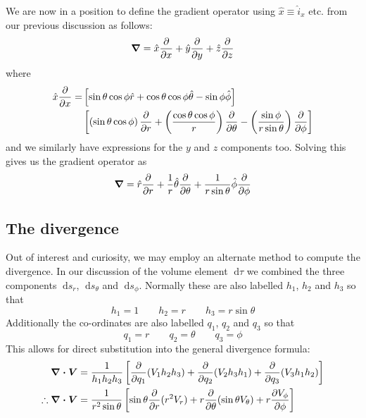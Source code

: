 \documentclass[english,seminar]{lecture}
\newcommand{\diff}{\;\textrm{d}}
\begin{document}
We are now in a position to define the gradient operator using $\hat{x} \equiv \hat{i}_x$ etc. from our previous discussion as follows:
\[
	\boldsymbol{\nabla} = \hat{x}{\partial\over\partial x} + \hat{y}{\partial\over\partial y} + \hat{z}{\partial\over\partial z}
\]
where
\begin{align*}
\hat{x}{\partial\over\partial x} = &\left[ \sin\theta\cos\phi\hat{r} + \cos\theta\cos\phi\hat{\theta} - \sin\phi\hat{\phi} \right] \\
&\left[ \left(\sin\theta\cos\phi\right){\partial\over\partial r} + \left({\cos\theta\cos\phi\over r}\right){\partial\over\partial \theta} - \left({\sin\phi\over r\sin\theta}\right){\partial\over\partial \phi}\right]
\end{align*}
and we similarly have expressions for the $y$ and $z$ components too. Solving this gives us the gradient operator as
\begin{equation}
	\boldsymbol{\nabla} = \hat{r}{\partial\over\partial r} + {1\over r}\hat{\theta}{\partial\over\partial \theta} + {1\over r\sin\theta}\hat{\phi}{\partial\over\partial \phi} \label{eq:gradient-op}
\end{equation}

\subsection{The divergence}
Out of interest and curiosity, we may employ an alternate method to compute the divergence.  In our discussion of the volume element $\diff \tau$ we combined the three components $\diff s_r$, $\diff s_\theta$ and $\diff s_\phi$. Normally these are also labelled $h_1$, $h_2$ and $h_3$ so that 
\[
h_1 = 1 \qquad h_2 = r \qquad h_3 = r\sin\theta
\]
Additionally the co-ordinates are also labelled $q_1$, $q_2$ and $q_3$ so that
\[
q_1 = r \qquad q_2 = \theta \qquad q_3 = \phi
\]
This allows for direct substitution into the general divergence formula:
\begin{align}
	\boldsymbol{\nabla\cdot V} &= {1\over h_1h_2h_3} \left[ {\partial\over\partial q_1} (V_1h_2h_3) + {\partial\over\partial q_2} (V_2h_3h_1) + {\partial\over\partial q_3} (V_3h_1h_2) \right] \nonumber\\
	\therefore \boldsymbol{\nabla\cdot V} &= {1\over r^2\sin\theta}\left[ \sin\theta {\partial\over\partial r} (r^2V_r) + r {\partial\over\partial \theta} (\sin\theta V_\theta) + r {\partial V_\phi\over\partial\phi} \right] \label{eq:divergence-op}
\end{align}
\end{document}
